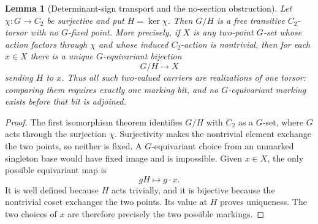 \documentclass[11pt]{article}
\newtheorem{lemma}[theorem]{Lemma}
\theoremstyle{definition}
\theoremstyle{remark}
\begin{document}
\begin{lemma}[Determinant-sign transport and the no-section obstruction]
\label{lem:sign-torsor-no-section}
Let $\chi:G\to C_2$ be surjective and put $H=\ker\chi$.  Then $G/H$ is a
free transitive $C_2$-torsor with no $G$-fixed point.  More precisely, if
$X$ is any two-point $G$-set whose action factors through $\chi$ and whose
induced $C_2$-action is nontrivial, then for each $x\in X$ there is a
unique $G$-equivariant bijection
\[
 G/H\longrightarrow X
\]
sending $H$ to $x$.  Thus all such two-valued carriers are realizations of
one torsor: comparing them requires exactly one marking bit, and no
$G$-equivariant marking exists before that bit is adjoined.
\end{lemma}

\begin{proof}
The first isomorphism theorem identifies $G/H$ with $C_2$ as a
$G$-set, where $G$ acts through the surjection $\chi$.  Surjectivity makes
the nontrivial element exchange the two points, so neither is fixed.  A
$G$-equivariant choice from an unmarked singleton base would have fixed
image and is impossible.  Given $x\in X$, the only possible equivariant
map is
\[
 gH\longmapsto g\cdot x.
\]
It is well defined because $H$ acts trivially, and it is bijective because
the nontrivial coset exchanges the two points.  Its value at $H$ proves
uniqueness.  The two choices of $x$ are therefore precisely the two
possible markings.
\end{proof}
\end{document}
